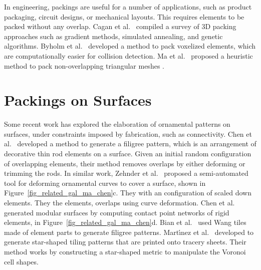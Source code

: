 \newtext
{
In engineering, packings are useful for a number of applications, 
such as product packaging, circuit designs, or mechanical layouts.
This requires elements to be packed without any overlap.
Cagan et al.~\cite{Cagan2002} compiled a survey of 3D packing approaches such as
gradient methods, simulated annealing, and genetic algorithms.
Byholm et al.~\cite{Byholm2009} developed a method
to pack voxelized elements, which are computationally easier for collision detection.
Ma et al.~\cite{Ma2018} proposed a heuristic method to pack non-overlapping triangular meshes 
.
}



\section{Packings on Surfaces}

Some recent work has explored the elaboration of ornamental
patterns on surfaces, under constraints imposed by fabrication, such as connectivity.  
Chen et al.~\cite{Chen2016} developed a method to generate a filigree pattern,
which is an arrangement of decorative thin rod elements on a surface.
Given an initial random configuration of overlapping elements, their method
removes overlaps by either deforming or trimming the rods.
In similar work, Zehnder et al.~\cite{Zehnder2016} 
proposed a semi-automated tool for deforming ornamental curves to cover a surface,  shown in 
Figure~\ref{fig_related_gal_ma_chen}c. 
They  with an  configuration of scaled down elements. 
They  the elements,  overlaps using curve deformation.
Chen et al.~\cite{Chen2017} generated modular surfaces by
computing contact point networks of rigid elements,  in Figure~\ref{fig_related_gal_ma_chen}d.
Bian et al.~\cite{Bian2018} used Wang tiles made of element parts to generate filigree patterns.
Mart\'{\i}nez et al.~\cite{Martinez2019} developed  to generate
star-shaped tiling patterns that are printed onto tracery sheets.
Their method works by constructing a star-shaped metric to manipulate the Voronoi cell shapes. 


